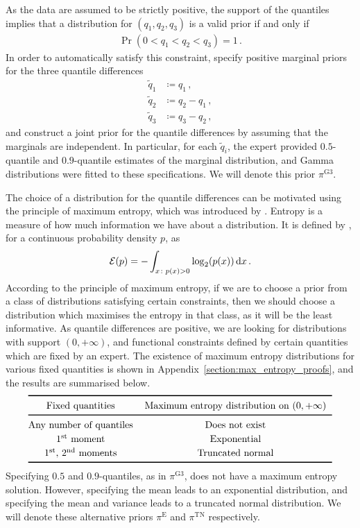 \documentclass{article}
\newcommand{\dd}{{\rm d}}
\newcommand{\st}{\textsuperscript{st}}
\newcommand{\nd}{\textsuperscript{nd}}
\begin{document}
%
As the data are assumed to be strictly positive,
the support of the quantiles implies
that a distribution for $(q_1, q_2, q_3)$ is a valid prior if and only if
%
\begin{align*}
	\Pr(0 < q_1 < q_2 < q_3) = 1\,.
\end{align*}
%
In order to automatically satisfy this constraint,
\cite{coles1996} specify positive marginal priors
for the three quantile differences
%
\begin{align*}
	\tilde{q}_1 &\coloneqq q_1 \,,\\
	\tilde{q}_2 &\coloneqq q_2 - q_1 \,,\\
	\tilde{q}_3 &\coloneqq q_3 - q_2 \,,
\end{align*}
%
and construct a joint prior for the quantile differences
by assuming that the marginals are independent.
In particular, for each $\tilde{q}_i$,
the expert provided $0.5$-quantile and $0.9$-quantile estimates
of the marginal distribution,
and Gamma distributions were fitted to these specifications.
We will denote this prior $\pi^{\text{G3}}$.
%

%
The choice of a distribution for the quantile differences can be motivated
using the principle of maximum entropy,
which was introduced by \cite{jaynes1957}.
Entropy is a measure of how much information we have about a distribution.
It is defined by \cite{shannon1948},
for a continuous probability density $p$, as
%
\begin{align*}
	{\cal E}(p) = -\int_{x \colon p(x) > 0} \log_2(p(x)) \, \dd x \,.
\end{align*}
%
According to the principle of maximum entropy,
if we are to choose a prior from a class of distributions satisfying
certain constraints,
then we should choose a distribution which maximises the entropy in that class,
as it will be the least informative.
As quantile differences are positive,
we are looking for distributions with support $(0, +\infty)$,
and functional constraints defined by
certain quantities which are fixed by an expert.
The existence of maximum entropy distributions
for various fixed quantities is shown in
Appendix~\ref{section:max_entropy_proofs},
and the results are summarised below.
%
\begin{align*}
	\centering
	\renewcommand{\arraystretch}{1.2}
	\begin{tabular}{@{}ccc@{}}
		\toprule[0.1em]
		Fixed quantities &Maximum entropy distribution on $(0, +\infty)$\\
		\midrule[0.1em]
		Any number of quantiles &Does not exist \\
		1\st\ moment &Exponential \\
		1\st, 2\nd\ moments &Truncated normal \\
		\bottomrule[0.1em]
	\end{tabular}
\end{align*}
%
Specifying $0.5$ and $0.9$-quantiles, as in $\pi^{\text{G3}}$,
does not have a maximum entropy solution.
However, specifying the mean leads to an exponential distribution,
and specifying the mean and variance leads to a truncated normal distribution.
We will denote these alternative priors
$\pi^{\text{E}}$ and $\pi^{\text{TN}}$ respectively.
%
\end{document}
